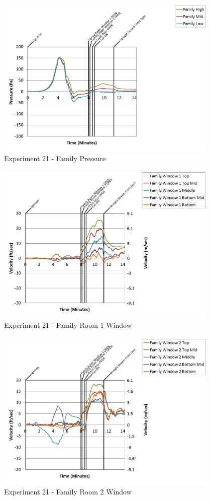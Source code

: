 \documentclass{article}
\begin{document}
\begin{appendices}
\clearpage

\begin{figure}[h!]
	\centering
	\includegraphics[height=3.05in]{0_Images/Results_Charts/Exp_21_Charts/FamilyPressure.png}
	\caption{Experiment 21 - Family Pressure}
\end{figure}


\begin{figure}[h!]
	\centering
	\includegraphics[height=3.05in]{0_Images/Results_Charts/Exp_21_Charts/FamilyRoom1Window.png}
	\caption{Experiment 21 - Family Room 1 Window}
\end{figure}

\clearpage

\begin{figure}[h!]
	\centering
	\includegraphics[height=3.05in]{0_Images/Results_Charts/Exp_21_Charts/FamilyRoom2Window.png}
	\caption{Experiment 21 - Family Room 2 Window}
\end{figure}



\end{appendices}
\end{document}
